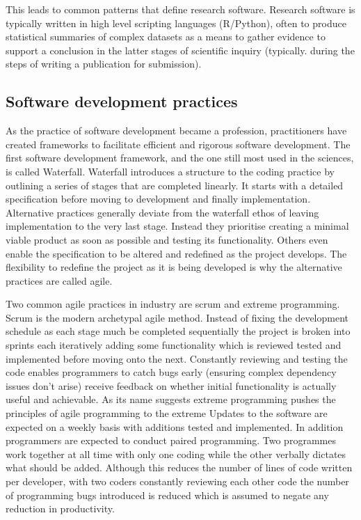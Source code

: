 \documentclass{SBCbookchapter}
\begin{document}
This leads to common patterns that define research software. Research software is typically written in high level scripting languages (R/Python), often to produce statistical summaries of complex datasets as a means to gather evidence to support a conclusion in the latter stages of scientific inquiry (typically. during the steps of writing a publication for submission).

\subsection{Software development practices}

As the practice of software development became a profession, practitioners have created frameworks to facilitate efficient and rigorous software development.
The first software development framework, and the one still most used in the sciences, is called Waterfall.
Waterfall introduces a structure to the coding practice by outlining a series of stages that are completed linearly.
It starts with a detailed specification before moving to development and finally implementation.
Alternative practices generally deviate from the waterfall ethos of leaving implementation to the very last stage.
Instead they prioritise creating a minimal viable product as soon as possible and testing its functionality.
Others even enable the specification to be altered and redefined as the project develops.
The flexibility to redefine the project as it is being developed is why the alternative practices are called agile. 

Two common agile practices in industry are scrum and extreme programming.
Scrum is the modern archetypal agile method.
Instead of fixing the development schedule as each stage much be completed sequentially the project is broken into sprints each iteratively adding some functionality which is reviewed tested and implemented before moving onto the next.
Constantly reviewing and testing the code enables programmers to catch bugs early (ensuring complex dependency issues don't arise) receive feedback on whether initial functionality is actually useful and achievable.
As its name suggests extreme programming pushes the principles of agile programming to the extreme
Updates to the software are expected on a weekly basis with additions tested and implemented. 
In addition programmers are expected to conduct paired programming. 
Two programmes work together at all time with only one coding while the other verbally dictates what should be added. 
Although this reduces the number of lines of code written per developer, with two coders constantly reviewing each other code the number of programming bugs introduced is reduced which is assumed to negate any reduction in productivity.
\end{document}

